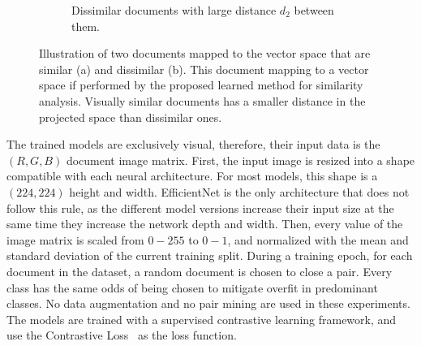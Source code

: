 \begin{figure}[ht!]
\begin{subfigure}[b]{0.99\textwidth}
        \caption{Dissimilar documents with large distance $d_2$ between them.}
        \label{fig:dissimilar_docs}
    \end{subfigure}
    \caption{Illustration of two documents mapped to the vector space that are similar (a) and dissimilar (b). This document mapping to a vector space if performed by the proposed learned method for similarity analysis. Visually similar documents has a smaller distance in the projected space than dissimilar ones.}
    \label{fig:vector_space_mapping}
\end{figure}

The trained models are exclusively visual, therefore, their input data is the $(R, G, B)$ document image matrix. First, the input image is resized into a shape compatible with each neural architecture. For most models, this shape is a $(224, 224)$ height and width. EfficientNet is the only architecture that does not follow this rule, as the different model versions increase their input size at the same time they increase the network depth and width. Then, every value of the image matrix is scaled from $0-255$ to $0-1$, and normalized with the mean and standard deviation of the current training split. During a training epoch, for each document in the dataset, a random document is chosen to close a pair. Every class has the same odds of being chosen to mitigate overfit in predominant classes. No data augmentation and no pair mining are used in these experiments. The models are trained with a supervised contrastive learning framework, and use the Contrastive Loss~\cite{chopra_learning_2005} as the loss function.
